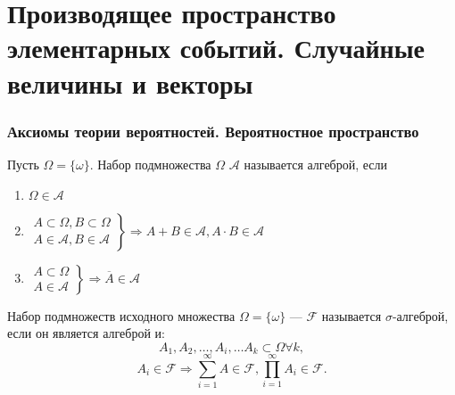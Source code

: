 \part{Производящее пространство элементарных событий. Случайные величины и векторы}
\section{Аксиомы теории вероятностей. Вероятностное пространство}
\begin{definition}
  Пусть $\Omega = \{\omega\}$. Набор подмножества $\Omega$ $\mathcal{A}$ называется алгеброй, если
  \begin{enumerate}
    \item $\Omega \in \mathcal{A}$
    \item $\left.
\begin{aligned}
A \subset \Omega, B \subset \Omega \\
A \in \mathcal{A}, B \in \mathcal{A}
\end{aligned}
\right\} \Rightarrow A + B \in \mathcal{A}, A \cdot B \in \mathcal{A}$
  \item $\left.
\begin{aligned}
A \subset \Omega \\
A \in \mathcal{A}
\end{aligned}
\right\} \Rightarrow \overline{A} \in \mathcal{A}$
  \end{enumerate}
\end{definition}
\begin{definition}
  Набор подмножеств исходного множества $\Omega = \{\omega\}$ --- $\mathcal{F}$ называется $\sigma$-алгеброй, если он является алгеброй и:
  \[
    A_1, A_2, \dots, A_i, \dots A_k \subset \Omega \forall k,
  \]
  \[
    A_i \in \mathcal{F} \Rightarrow \sum\limits_{i=1}^\infty A \in \mathcal{F}, \prod\limits_{i=1}^\infty A_i \in \mathcal{F}.
  \]
\end{definition}
